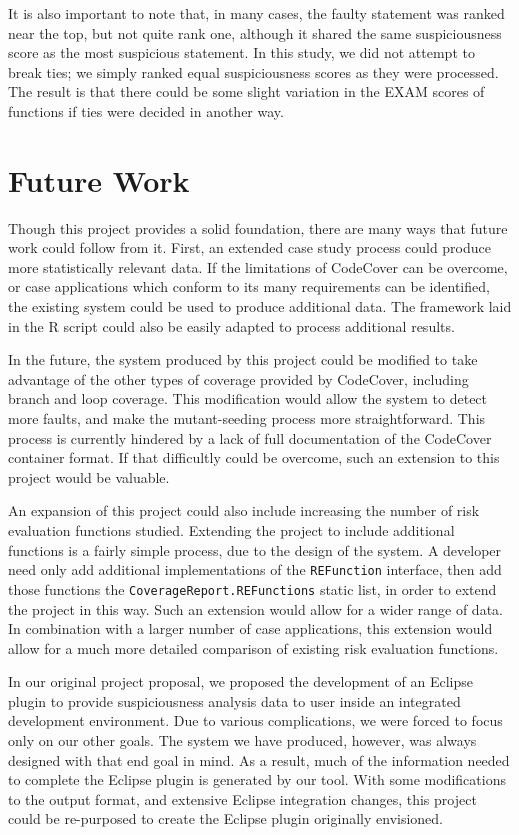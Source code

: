 It is also important to note that, in many cases, the faulty statement was ranked near 
the top, but not quite rank one, although it shared the same suspiciousness score as
the most suspicious statement.  In this study, we did not attempt to break ties; we simply
ranked equal suspiciousness scores as they were processed.  The result is that there could
be some slight variation in the EXAM scores of functions if ties were decided in another way.

\section{Future Work}\label{sec:future}

Though this project provides a solid foundation, there are many ways that future work
could follow from it.  First, an extended case study process could produce more statistically
relevant data.  If the limitations of CodeCover can be overcome, or case applications which
conform to its many requirements can be identified, the existing system could be used to
produce additional data.  The framework laid in the R script could also be easily adapted to
process additional results.  

In the future, the system produced by this project could be modified to take advantage of the
other types of coverage provided by CodeCover, including branch and loop coverage.  This modification would
allow the system to detect more faults, and make the mutant-seeding process more
straightforward.  This process is currently hindered by a lack of full documentation of the CodeCover 
container format.  If that difficultly could be overcome, such an extension to this project
would be valuable.

An expansion of this project could also include increasing the number of risk evaluation
functions studied.  Extending the project to include additional functions is a fairly simple
process, due to the design of the system.  A developer need only add additional implementations
of the \texttt{REFunction} interface, then add those functions the \texttt{CoverageReport.REFunctions}
static list, in order to extend the project in this way.  Such an extension would allow for 
a wider range of data.  In combination with a larger number of case applications, this
extension would allow for a much more detailed comparison of existing risk evaluation functions.

In our original project proposal, we proposed the development of an Eclipse plugin to provide
suspiciousness analysis data to user inside an integrated development environment.  Due to
various complications, we were forced to focus only on our other goals.  The system we have
produced, however, was always designed with that end goal in mind.  As a result, much of the
information needed to complete the Eclipse plugin is generated by our tool.  With some 
modifications to the output format, and extensive Eclipse integration changes, this project
could be re-purposed to create the Eclipse plugin originally envisioned.

